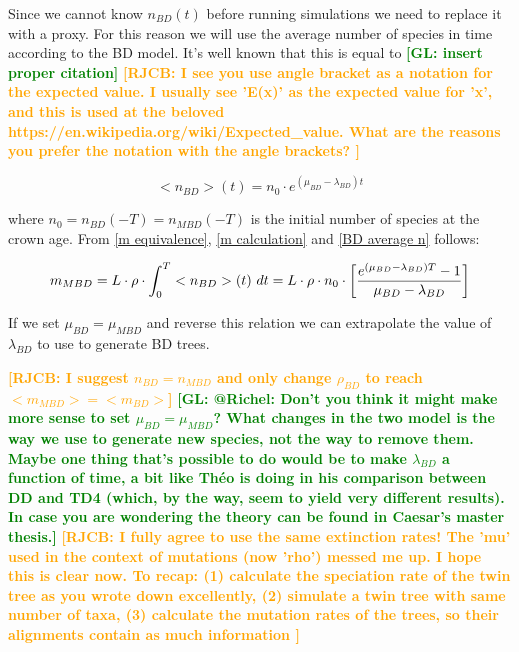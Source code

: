 \documentclass{article}
\newcommand*\richel[1]{\textcolor{orange}{\textbf{[RJCB: #1]}}}
\newcommand*\gio[1]{\textcolor{green}{\textbf{[GL: #1]}}}
\begin{document}
Since we cannot know $n_{BD}(t)$ before running simulations
we need to replace it with a proxy. 
For this reason we will use the average number of
species in time according to the BD model. 
It's well known that this is equal to \gio{insert proper citation}
\richel{
  I see you use angle bracket as a notation for the expected
  value. I usually see 'E(x)' as the expected value for 'x',
  and this is used at the beloved https://en.wikipedia.org/wiki/Expected_value.
  What are the reasons you prefer the notation with the angle brackets?  
}

\begin{equation}
    <n_{BD}>(t) = n_{0} \cdot e^{(\mu_{BD} - \lambda_{BD})t} \label{BD average n}
\end{equation}

where $n_{0} = n_{BD}(-T) = n_{MBD}(-T)$ is the initial number of species at the crown age.
From \ref{m equivalence}, \ref{m calculation} and \ref{BD average n} follows:

\begin{equation}
m_{MBD} = L \cdot \rho \cdot \int_{0}^{T} <n_{BD}>(t)\ dt \\
= L \cdot \rho \cdot n_{0} \cdot \left[ \frac{e^{(\mu_{BD} - \lambda_{BD})T} - 1}{\mu_{BD} - \lambda_{BD}} \right]
\end{equation}

If we set $\mu_{BD} = \mu_{MBD}$ and reverse this relation we can extrapolate the value of $\lambda_{BD}$ to use to generate BD trees.

\richel{I suggest $n_{BD} = n_{MBD}$ and only 
change $\rho_{BD}$ to reach $<m_{MBD}> = <m_{BD}>$}
\gio{@Richel: Don't you think it might make more sense to set $\mu_{BD} = \mu_{MBD}$? What changes in the two model is the way we use to generate new species, not the way to remove them. Maybe one thing that's possible to do would be to make $\lambda_{BD}$ a function of time, a bit like Théo is doing in his comparison between DD and TD4 (which, by the way, seem to yield very different results). In case you are wondering the theory can be found in Caesar's master thesis.}
\richel{
  I fully agree to use the same extinction rates!
  The 'mu' used in the context of mutations (now 'rho') messed me up.
  I hope this is clear now. To recap: 
  (1) calculate the speciation rate of the twin tree as you wrote down excellently,
  (2) simulate a twin tree with same number of taxa,
  (3) calculate the mutation rates of the trees, 
    so their alignments contain as much information
}
\end{document}
